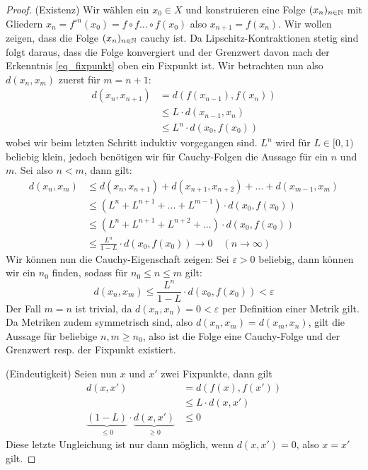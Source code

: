 \begin{proof}
(Existenz) Wir wählen ein $x_0 \in X$ und konstruieren eine Folge $(x_n)_{n \in \mathbb{N}}$ mit Gliedern $x_n = f^{\circ n}(x_0) = f\circ f...\circ f (x_0)$ also $x_{n+1} = f(x_n)$. Wir wollen zeigen, dass die Folge $(x_n)_{n \in \mathbb{N}}$ cauchy ist. Da Lipschitz-Kontraktionen stetig sind folgt daraus, dass die Folge konvergiert und der Grenzwert davon nach der Erkenntnis \ref{eq_fixpunkt} oben ein Fixpunkt ist. Wir betrachten nun also $d(x_n,x_m)$ zuerst für $m=n+1$:
\begin{align*}
    d(x_n,x_{n+1}) &= d(f(x_{n-1}), f(x_n))\\
    &\leq L \cdot d(x_{n-1}, x_n)\\
    &\leq L^n \cdot d(x_0, f(x_0))
\end{align*}
wobei wir beim letzten Schritt induktiv vorgegangen sind. $L^n$ wird für $L \in [0,1)$ beliebig klein, jedoch benötigen wir für Cauchy-Folgen die Aussage für ein $n$ und $m$. Sei also $n < m$, dann gilt:
\begin{align*}
    d(x_n,x_m) &\leq d(x_n, x_{n+1}) + d(x_{n+1}, x_{n+2}) + ... + d(x_{m-1}, x_m)\\
    &\leq (L^n + L^{n+1} + ... + L^{m-1}) \cdot d(x_0, f(x_0))\\
    &\leq (L^n + L^{n+1} + L^{n+2} + ...) \cdot d(x_0, f(x_0))\\
    &\leq \frac{L^n}{1-L} \cdot d(x_0, f(x_0)) \longrightarrow 0 \quad (n \to \infty)
\end{align*}
Wir können nun die Cauchy-Eigenschaft zeigen: Sei $\varepsilon > 0$ beliebig, dann können wir ein $n_0$ finden, sodass für $n_0 \leq n \leq m$ gilt:
$$d(x_n, x_m) \leq \frac{L^n}{1-L} \cdot d(x_0, f(x_0)) < \varepsilon$$
Der Fall $m = n$ ist trivial, da $d(x_n, x_n) = 0 < \varepsilon$ per Definition einer Metrik gilt. Da Metriken zudem symmetrisch sind, also $d(x_n, x_m) = d(x_m, x_n)$, gilt die Aussage für beliebige $n,m \geq n_0$, also ist die Folge eine Cauchy-Folge und der Grenzwert resp. der Fixpunkt existiert.

(Eindeutigkeit) Seien nun $x$ und $x'$ zwei Fixpunkte, dann gilt
\begin{align*}
    d(x,x') &= d(f(x), f(x'))\\
    &\leq L \cdot d(x, x')\\
    \underbrace{(1-L)}_{\leq 0}\cdot \underbrace{ d(x, x')}_{\geq 0} &\leq 0
\end{align*}
Diese letzte Ungleichung ist nur dann möglich, wenn $d(x,x') =0$, also $x = x'$ gilt.
\end{proof}


